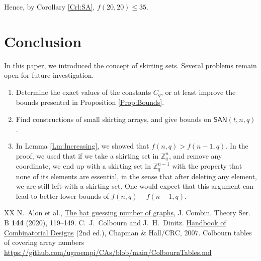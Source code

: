 \documentclass[12pt,reqno]{article}
\newcommand{\ZZ}{\mathbb Z}
\newcommand{\SAN}{\mathsf{SAN}}
\begin{document}
Hence, by Corollary \ref{Crl:SA}, $f(20,20) \leq 35$.

\section{Conclusion}

In this paper, we introduced the concept of skirting sets.
Several problems remain open for future investigation.
\begin{enumerate}
 \item Determine the exact values of the constants $C_q$, or at least improve the bounds presented in Proposition \ref{Prop:Bounds}.
 \item Find constructions of small skirting arrays, and give bounds on $\SAN(t,n,q)$.
 \item In Lemma \ref{Lm:Increasing}, we showed that $f(n,q) > f(n-1,q)$. In the proof, we used that if we take a skirting set in $\ZZ_q^n$, and remove any coordinate, we end up with a skirting set in $\ZZ_q^{n-1}$ with the property that none of its elements are essential, in the sense that after deleting any element, we are still left with a skirting set.
 One would expect that this argument can lead to better lower bounds of $f(n,q) - f(n-1,q)$.
\end{enumerate}






\begin{thebibliography}{XX}
 N.~Alon et al., \underline{The hat guessing number of graphs}, J. Combin. Theory Ser. B {\bf 144} (2020), 119--149.
 C.~J.~Colbourn and J.~H.~Dinitz. \underline{Handbook of Combinatorial Designs} (2nd ed.), Chapman \& Hall/CRC, 2007.
 Colbourn tables of covering array numbers \url{https://github.com/ugroempi/CAs/blob/main/ColbournTables.md}
\end{thebibliography}
\end{document}
